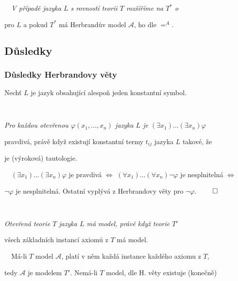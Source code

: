     {\it {}\ \ V případě jazyka $L$ s rovností teorii $T$ rozšíříme na $T^*$ o 
    \vspace{0.5mm}
    
     pro $L$ a pokud $T^*$ má Herbrandův model $\mathcal{A}$,  ho dle $=^A$.}
    

\subsection{Důsledky}\todo

\subsubsection*{Důsledky Herbrandovy věty}
    Nechť $L$ je jazyk obsahující alespoň jeden konstantní symbol.
    \medskip
    
    {\bf {}}\ \ {\it Pro každou otevřenou $\varphi(x_1,\dots,x_n)$ jazyka $L$ je $(\exists x_1)\dots(\exists x_n)\varphi$
    \smallskip
    
    pravdivá, právě když existují konstantní termy $t_{ij}$ jazyka $L$ takové, že
    \vspace{-2mm}
    
    \vspace{-6mm}
    je (výroková) tautologie.}
    \medskip
    
    {\it {}}\ \ $(\exists x_1)\dots(\exists x_n)\varphi$ je pravdivá $\Leftrightarrow$ $(\forall x_1)\dots(\forall x_n)\neg\varphi$ je nesplnitelná $\Leftrightarrow$
    \smallskip
    
    $\neg \varphi$ je nesplnitelná. Ostatní vyplývá z Herbrandovy věty pro $\neg \varphi$. $\qed$
    \bigskip
    
    {\bf {}}\ \ {\it Otevřená teorie $T$ jazyka $L$ má model, právě když teorie $T'$
    \smallskip
    
    všech základních instancí axiomů z $T$  má model.}
    \medskip
    
    {\it {}}\ \ Má-li $T$ model $\mathcal{A}$, platí v něm každá instance každého axiomu z $T$,
    \smallskip
    
    tedy $\mathcal{A}$ je modelem $T'$. Nemá-li $T$ model, dle H. věty existuje (konečně)
    \smallskip
    
